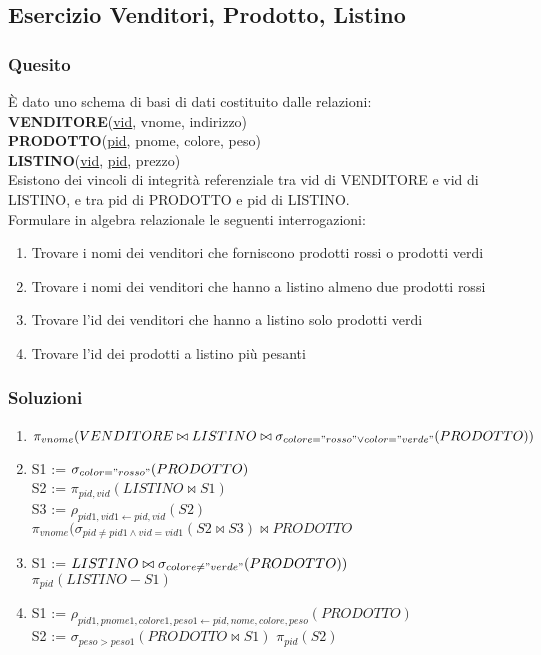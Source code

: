 \subsection{Esercizio Venditori, Prodotto, Listino}
\subsubsection{Quesito}

È dato uno schema di basi di dati costituito dalle relazioni: \\

\indent \textbf{VENDITORE}(\underline{vid}, vnome, indirizzo) \\
\indent \textbf{PRODOTTO}(\underline{pid}, pnome, colore, peso) \\
\indent \textbf{LISTINO}(\underline{vid}, \underline{pid}, prezzo) \\

Esistono dei vincoli di integrità referenziale tra vid di VENDITORE
e vid di LISTINO, e tra pid di PRODOTTO e pid di LISTINO. \\

Formulare in algebra relazionale le seguenti interrogazioni:
\begin{enumerate}
  \item Trovare i nomi dei venditori che forniscono prodotti rossi o prodotti verdi
  \item Trovare i nomi dei venditori che hanno a listino almeno due prodotti rossi
  \item Trovare l'id dei venditori che hanno a listino solo prodotti verdi
  \item Trovare l'id dei prodotti a listino più pesanti
\end{enumerate}

\subsubsection{Soluzioni}

\begin{enumerate}
  \item $\pi_{vnome}(VENDITORE \bowtie LISTINO \bowtie \sigma_{colore="rosso" \lor color="verde"}(PRODOTTO))$
  \item
    S1 := $\sigma_{color="rosso"}(PRODOTTO)$ \\
    S2 := $\pi_{pid,vid}(LISTINO \bowtie S1)$ \\
    S3 := $\rho_{pid1,vid1 \leftarrow pid,vid}(S2)$ \\
    $\pi_{vnome}(\sigma_{pid \neq pid1 \land vid = vid1}(S2 \bowtie S3) \bowtie PRODOTTO$
  \item
    S1 := $LISTINO \bowtie \sigma_{colore \neq "verde"} (PRODOTTO))$ \\
    $\pi_{pid}(LISTINO - S1)$
  \item
    S1 := $\rho_{pid1,pnome1,colore1,peso1 \leftarrow pid,nome,colore,peso}(PRODOTTO)$ \\
    S2 := $\sigma_{peso>peso1}(PRODOTTO \bowtie S1)$
    $\pi_{pid}(S2)$
\end{enumerate}
